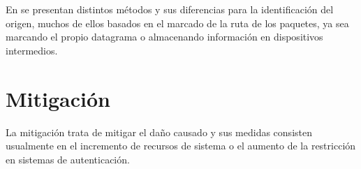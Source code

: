 En \cite{traceback2:2014} se presentan distintos métodos y sus diferencias para la identificación del origen, muchos de ellos basados en el marcado de la ruta de los paquetes, ya sea marcando el propio datagrama o almacenando información en dispositivos intermedios.

\section{Mitigación}
La mitigación trata de mitigar el da\~no causado y sus medidas consisten usualmente en el incremento de recursos de sistema o el aumento de la restricción en sistemas de autenticación.
